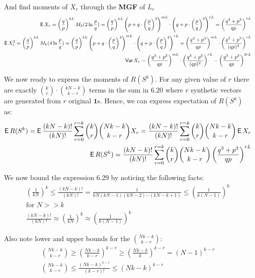 \documentclass[11pt]{article}
\newcommand{\uv}{\textbf{1}}
\begin{document}
And find moments of $X_r$ through the \textbf{MGF} of $L_r$
\begin{align}
\operatorname{\mathsf{E}} X_r =   \left ( \frac{q}{p} \right )^{kL}  M_k(2 \ln { \frac{p}{q}}) =  \left ( \frac{q}{p} \right )^{kL}  \left (p + q \cdot   \left ( \frac{p}{q} \right )^2 \right )^{mL}\cdot \left (q + p\cdot   \left ( \frac{p}{q} \right )^2 \right)^{rL} = \left ( \frac{q^3 + p^3} {qp} \right )^{rL} \\
\operatorname{\mathsf{E}} X^2_r =  \left ( \frac{q}{p} \right )^{kL}  M_k(4 \ln { \frac{p}{q}})  = \left ( \frac{q}{p} \right )^{kL}  \left (p + q \cdot   \left ( \frac{p}{q} \right )^4 \right )^{mL}\cdot \left (q + p\cdot   \left ( \frac{p}{q} \right )^4 \right)^{rL} =  \left ( \frac{q^3 + p^3} {qp} \right )^{mL} \cdot  \left ( \frac{q^5 + p^5} {(qp)^2} \right )^{rL}  \\
\operatorname{\mathsf{Var}} X_r = \left ( \frac{q^3 + p^3} {qp} \right )^{mL} \cdot  \left ( \frac{q^5 + p^5} {(qp)^2} \right )^{rL}  - \left ( \frac{q^3 + p^3} {qp} \right )^{2rL}
\end{align}

We now ready to express the moments of $R(S^k)$.   For any given value of $r$ there are exactly $\binom{k}{r} \cdot \binom{kN-k}{k-r}$ terms in the sum in $6.20$ where $r$ synthetic vectors are generated from $r$ original $\uv$s.  Hence, we can express expectation of $R(S^k)$ as:
\begin{align}
\operatorname{\mathsf{E}} R(S^k) =  \operatorname{\mathsf{E}} \frac{ (kN-k)! }{(kN)!}   \sum_{r=0}^{r=k} \binom{k}{r} \binom{Nk-k}{k-r} X_r = \frac{ (kN-k)! }{(kN)!}   \sum_{r=0}^{r=k} \binom{k}{r} \binom{Nk-k}{k-r} \operatorname{\mathsf{E}} X_r \\
\operatorname{\mathsf{E}} R(S^k) =  \frac{ (kN-k)! }{(kN)!}  \sum_{r=0}^{r=k} \binom{k}{r} \binom{Nk-k}{k-r} \left ( \frac{q^3 + p^3} {qp} \right )^{rL}
\end{align}

We now bound the expression $6.29$ by noticing the following facts:
\begin{align}
\left ( \frac{1} { kN} \right )^k \le  \frac{ (kN-k)! }{(kN)!}   = \frac{1} { kN (kN - 1)(kN-2) \cdots (kN -k + 1)}  \le \left ( \frac{1} { k(N - 1)} \right )^k  \\
 \text{for } N >> k  \\
  \frac{ (kN-k)! }{(kN)!}   \approx \left ( \frac{1} { kN} \right )^k  \approx \left ( \frac{1} { k(N - 1)} \right )^k
\end{align}

Also note lower and upper bounds for the $ \binom{Nk-k}{k-r} $:
\begin{align}
 \binom{Nk-k}{k-r} \ge \left ( \frac{Nk-k}{k-r} \right )^{k-r} \ge \left ( \frac{Nk-k}{k} \right )^{k-r}  =  \left ( {N-1} \right )^{k-r}  \\
  \binom{Nk-k}{k-r} \le \frac{(Nk-k)^{k-r}} {(k-r)!} \le (Nk-k)^{k-r}
\end{align}
\end{document}
